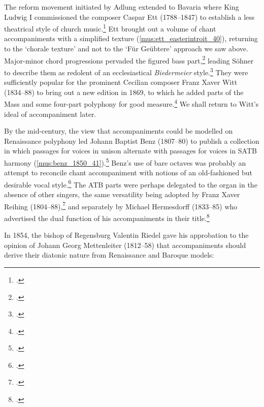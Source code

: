 %
The reform movement initiated by Adlung extended to Bavaria where King Ludwig I commissioned the composer Caspar Ett (1788--1847) to establish a less theatrical style of church music.\footcites[60]{HutchingsChurchmusicnineteenth1967}[p.~114 where the author mistakes Ludwig I for Ludwig II]{MuirRomanCatholicChurch2008}
Ett brought out a volume of chant accompaniments with a simplified texture (\cref{mus:ett_easterintroit_40}), returning to the `chorale texture' and not to the `Für Geübtere' approach we saw above.
Major-minor chord progressions pervaded the figured bass part,\footcite[40]{HauberCanticasacrausum1834} leading Söhner to describe them as redolent of an ecclesiastical \emph{Biedermeier} style.\footcites[124]{SoehnerGeschichteBegleitunggregorianischen1931}[37]{WagenerBegleitunggregorianischenChorals1964}
\label{ln:cecilian_octaves}%
They were sufficiently popular for the prominent Cecilian composer Franz Xaver Witt (1834--88) to bring out a new edition in 1869, to which he added parts of the Mass and some four-part polyphony for good measure.\footcite[unpaginated `Vorrende']{HauberCanticasacra1869}
We shall return to Witt's ideal of accompaniment later.
\noclub[2]
%

%
By the mid-century, the view that accompaniments could be modelled on Renaissance polyphony led Johann Baptist Benz (1807--80) to publish a collection in which passages for voices in unison alternate with passages for voices in SATB harmony (\cref{mus:benz_1850_41}).\footcite[1, 41]{BenzHarmoniasacraGregorianische1850}
Benz's use of bare octaves was probably an attempt to reconcile chant accompaniment with notions of an old-fashioned but desirable vocal style.\footcites[37]{BenzHarmoniasacraGregorianische1851}[1, 28]{BenzHarmoniasacraGregorianische1864}
The ATB parts were perhaps delegated to the organ in the absence of other singers, the same versatility being adopted by Franz Xaver Reihing (1804--88),\footcites[76]{ReihingCantionalechorioder1855}[Cited in][92]{WagenerBegleitunggregorianischenChorals1964} and separately by Michael Hermesdorff (1833--85) who advertised the dual function of his accompaniments in their title.\footnote{\covid{}\cite{HermesdorffHarmoniaCantusChoralis1865}.}

\label{int:mettenleiter}%
In 1854, the bishop of Regensburg Valentin Riedel gave his approbation to the opinion of Johann Georg Mettenleiter (1812--58) that accompaniments should derive their diatonic nature from Renaissance and Baroque models:


